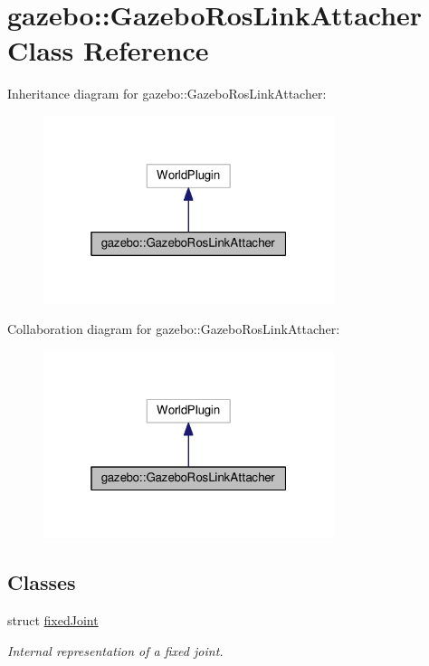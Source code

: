 \hypertarget{classgazebo_1_1GazeboRosLinkAttacher}{}\section{gazebo\+:\+:Gazebo\+Ros\+Link\+Attacher Class Reference}
\label{classgazebo_1_1GazeboRosLinkAttacher}


Inheritance diagram for gazebo\+:\+:Gazebo\+Ros\+Link\+Attacher\+:\nopagebreak
\begin{figure}[H]
\begin{center}
\leavevmode
\includegraphics[width=241pt]{classgazebo_1_1GazeboRosLinkAttacher__inherit__graph}
\end{center}
\end{figure}


Collaboration diagram for gazebo\+:\+:Gazebo\+Ros\+Link\+Attacher\+:\nopagebreak
\begin{figure}[H]
\begin{center}
\leavevmode
\includegraphics[width=241pt]{classgazebo_1_1GazeboRosLinkAttacher__coll__graph}
\end{center}
\end{figure}
\subsection*{Classes}
\begin{DoxyCompactItemize}
\item 
struct \hyperlink{structgazebo_1_1GazeboRosLinkAttacher_1_1fixedJoint}{fixed\+Joint}
\begin{DoxyCompactList}\small\item\em Internal representation of a fixed joint. \end{DoxyCompactList}\end{DoxyCompactItemize}
